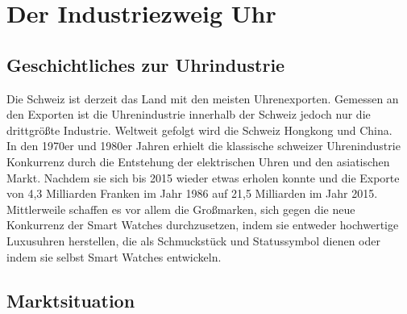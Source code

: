 \clearpage
\chapter{Der Industriezweig Uhr}
\section{Geschichtliches zur Uhrindustrie}
Die Schweiz ist derzeit das Land mit den meisten Uhrenexporten. Gemessen an den Exporten ist die Uhrenindustrie innerhalb der Schweiz jedoch nur die drittgrößte Industrie. Weltweit gefolgt wird die Schweiz Hongkong und China.\\ 
In den 1970er und 1980er Jahren erhielt die klassische schweizer Uhrenindustrie Konkurrenz durch die Entstehung der elektrischen Uhren und den asiatischen Markt. Nachdem sie sich bis 2015 wieder etwas erholen konnte und die Exporte von 4,3 Milliarden Franken im Jahr 1986 auf 21,5 Milliarden im Jahr 2015.\\ 
Mittlerweile schaffen es vor allem die Großmarken, sich gegen die neue Konkurrenz der Smart Watches durchzusetzen, indem sie entweder hochwertige Luxusuhren herstellen, die als Schmuckstück und Statussymbol dienen oder indem sie selbst Smart Watches entwickeln.

\section{Marktsituation}

